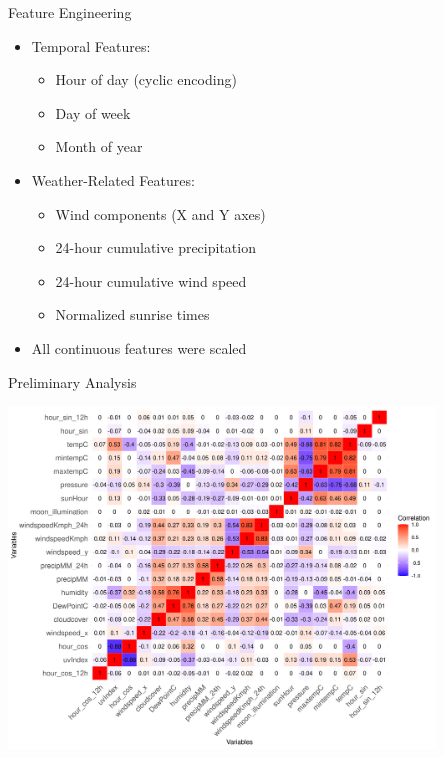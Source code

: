 \documentclass[svgnames, 10pt]{beamer}
\begin{document}
\begin{frame}{Feature Engineering}
\begin{itemize}
    \item Temporal Features:
        \begin{itemize}
            \item Hour of day (cyclic encoding)
            \item Day of week
            \item Month of year
        \end{itemize}
    \item Weather-Related Features:
        \begin{itemize}
            \item Wind components (X and Y axes)
            \item 24-hour cumulative precipitation
            \item 24-hour cumulative wind speed
            \item Normalized sunrise times
        \end{itemize}
    \item All continuous features were scaled
\end{itemize}
\end{frame}

\begin{frame}{Preliminary Analysis}
    \vspace{0.5em}
    \begin{center}
        \includegraphics[width=0.85\textwidth]{assets/feature-correlation-matrix-final.png}
    \end{center}
    \vfill
\end{frame}
\end{document}
